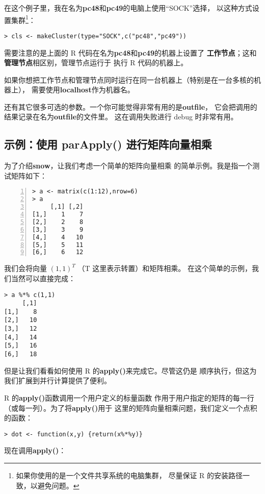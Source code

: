 在这个例子里，我在名为{\bf pc48}和{\bf pc49}的电脑上使用``SOCK''选择，
以这种方式设置集群\footnote{如果你使用的是一个文件共享系统的电脑集群，
尽量保证 R 的安装路径一致，以避免问题。}：

\begin{lstlisting}
> cls <- makeCluster(type="SOCK",c("pc48","pc49"))
\end{lstlisting}

需要注意的是上面的 R 代码在名为{\bf pc48}和{\bf pc49}的机器上设置了
{\bf 工作节点}；这和{\bf 管理节点}相区别，管理节点运行于
执行 R 代码的机器上。

如果你想把工作节点和管理节点同时运行在同一台机器上（特别是在一台多核的机器上），
需要使用{\bf localhost}作为机器名。

还有其它很多可选的参数。一个你可能觉得非常有用的是{\bf outfile}，
它会把调用的结果记录在名为{\bf outfile}的文件里。
这在调用失败进行 debug 时非常有用。

\subsection{示例：使用 parApply() 进行矩阵向量相乘}

为了介绍{\bf snow}，让我们考虑一个简单的矩阵向量相乘
的简单示例。我是指一个测试矩阵如下：

\begin{lstlisting}[numbers=left]
> a <- matrix(c(1:12),nrow=6)
> a
     [,1] [,2]
[1,]    1    7
[2,]    2    8
[3,]    3    9
[4,]    4   10
[5,]    5   11
[6,]    6   12
\end{lstlisting}

我们会将向量 $(1,1)^{T}$ （T 这里表示转置）和矩阵相乘。
在这个简单的示例，我们当然可以直接完成：

\begin{lstlisting}
> a %*% c(1,1)
     [,1]
[1,]    8
[2,]   10
[3,]   12
[4,]   14
[5,]   16
[6,]   18
\end{lstlisting}

但是让我们看看如何使用 R 的{\bf apply()}来完成它。尽管这仍是
顺序执行，但这为我们扩展到并行计算提供了便利。

R 的{\bf apply()}函数调用一个用户定义的标量函数
作用于用户指定的矩阵的每一行（或每一列）。为了将{\bf apply()}用于
这里的矩阵向量相乘问题，我们定义一个点积的函数：

\begin{lstlisting}
> dot <- function(x,y) {return(x%*%y)}
\end{lstlisting}

现在调用{\bf apply()}：

